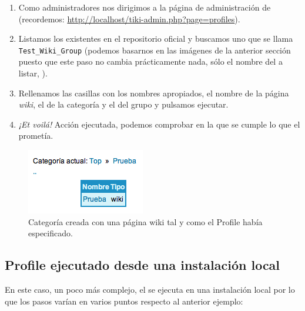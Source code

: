 \begin{enumerate}
\item Como administradores nos dirigimos a la página de administración de \profiles{} (recordemos: \url{http://localhost/tiki-admin.php?page=profiles}).

\item Listamos los \profiles{} existentes en el repositorio oficial y buscamos uno que se llama \texttt{Test\_Wiki\_Group} (podemos basarnos en las imágenes de la anterior sección puesto que este paso no cambia prácticamente nada, sólo el nombre del \profile{} a listar, ).

\item Rellenamos las casillas con los nombres apropiados, el nombre de la página \textit{wiki}, el de la categoría y el del grupo y pulsamos ejecutar.

\item \textit{¡Et voilá!} Acción ejecutada, podemos comprobar en la  que se cumple lo que el \profile{} prometía.

\end{enumerate}

\begin{figure}
\centering
\includegraphics{../graphics/fig_profile_ejemplo.png}
\caption{Categoría creada con una página wiki tal y como el Profile había especificado.}\label{fig:profile_ejemplo}
\end{figure}

\subsection{Profile ejecutado desde una instalación local}
\label{section:profile-creado-desde-cero}

En este caso, un poco más complejo, el \profile{} se ejecuta en una instalación local por lo que los pasos varían en varios puntos respecto al anterior ejemplo:

